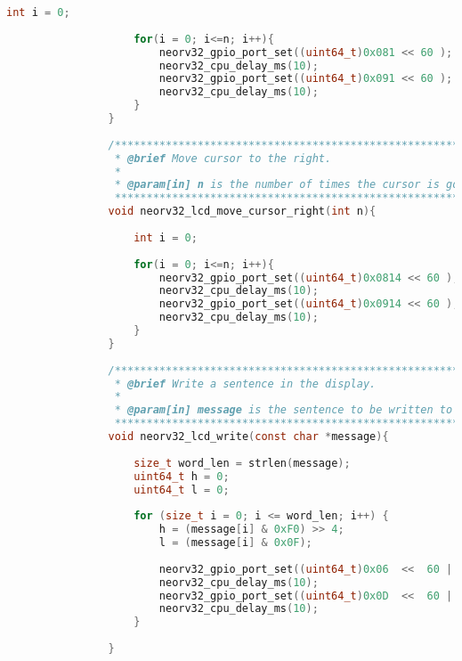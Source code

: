 \begin{lstlisting}[style=mystyle_c, language=c, breaklines]
                    int i = 0; 
                
                    for(i = 0; i<=n; i++){
                        neorv32_gpio_port_set((uint64_t)0x081 << 60 );
                        neorv32_cpu_delay_ms(10);
                        neorv32_gpio_port_set((uint64_t)0x091 << 60 );
                        neorv32_cpu_delay_ms(10);
                    }
                }
                
                /************************************************************//**
                 * @brief Move cursor to the right.
                 *
                 * @param[in] n is the number of times the cursor is going to the right.
                 ***************************************************************/
                void neorv32_lcd_move_cursor_right(int n){
                
                    int i = 0; 
                
                    for(i = 0; i<=n; i++){
                        neorv32_gpio_port_set((uint64_t)0x0814 << 60 );
                        neorv32_cpu_delay_ms(10);
                        neorv32_gpio_port_set((uint64_t)0x0914 << 60 );
                        neorv32_cpu_delay_ms(10);
                    }
                }
                
                /************************************************************//**
                 * @brief Write a sentence in the display.
                 *
                 * @param[in] message is the sentence to be written to the display.
                 ***************************************************************/
                void neorv32_lcd_write(const char *message){
                
                    size_t word_len = strlen(message);
                    uint64_t h = 0;
                    uint64_t l = 0;
                
                    for (size_t i = 0; i <= word_len; i++) {
                        h = (message[i] & 0xF0) >> 4;
                        l = (message[i] & 0x0F);
                
                        neorv32_gpio_port_set((uint64_t)0x06  <<  60 | h  <<  56 | l  <<  52);
                        neorv32_cpu_delay_ms(10);
                        neorv32_gpio_port_set((uint64_t)0x0D  <<  60 | h  <<  56 | l  <<  52);
                        neorv32_cpu_delay_ms(10);
                    }
                
                }
        \end{lstlisting}

